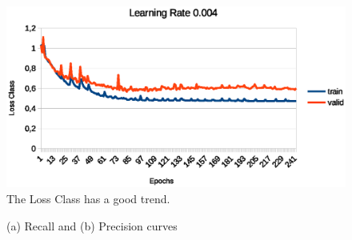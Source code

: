 \documentclass[10pt,twocolumn,letterpaper]{article}
\begin{document}
\begin{figure}[t]
\begin{center}
   \includegraphics[width=1\linewidth]{loss_class.eps}
\end{center}
   \caption{The Loss Class has a good trend.}
\label{fig:loss_class}
\label{fig:onecol}
\end{figure}

\begin{figure}
    \centering
    \caption{(a) Recall  and (b) Precision curves}
    \label{fig:recall_precision}
\end{figure}
\end{document}
